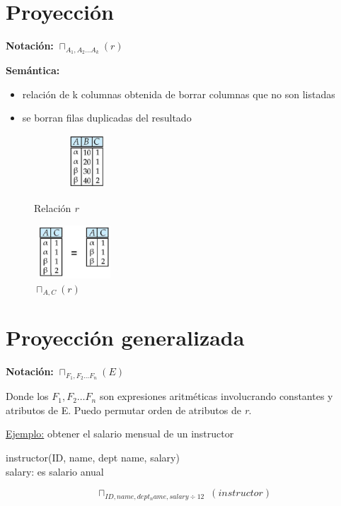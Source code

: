\documentclass[12pt,a4paper]{report}
\begin{document}
	\section{Proyección}
		\par \textbf{Notación:} $\sqcap_{A_{1}, A_{2} \dotsc A_{k}}(r)$
		\par \textbf{Semántica:}
		\begin{itemize}
			\item relación de k columnas obtenida de borrar columnas que no son listadas
			\item se borran filas duplicadas del resultado
		\end{itemize}
		
		\begin{figure}[htb]
				\centering
				\includegraphics[width=4cm, height=2cm]{./imagenes/proyeccion1.png}
				\caption{Relación \textit{r}}
				\includegraphics[width=3cm, height=2cm]{./imagenes/proyeccion2.png}
				\caption{$\sqcap_{A, C}(r)$}
		\end{figure}
	
	\section{Proyección generalizada}
		\par \textbf{Notación:} $\sqcap_{F_{1}, F_{2} \dotsc F_{n}}(E)$
		\par Donde los $F_{1}, F_{2} \dotsc F_{n}$ son expresiones aritméticas involucrando constantes y atributos de E. Puedo permutar orden de atributos de \textit{r}.
		
		\par \underline{Ejemplo:} obtener el salario mensual de un instructor
		\begin{center} instructor(ID, name, dept name, salary) \\ salary: es salario anual \end{center}
		\[\sqcap_{ID, name, dept_name, salary \div 12} \; (instructor)\]
\end{document}
